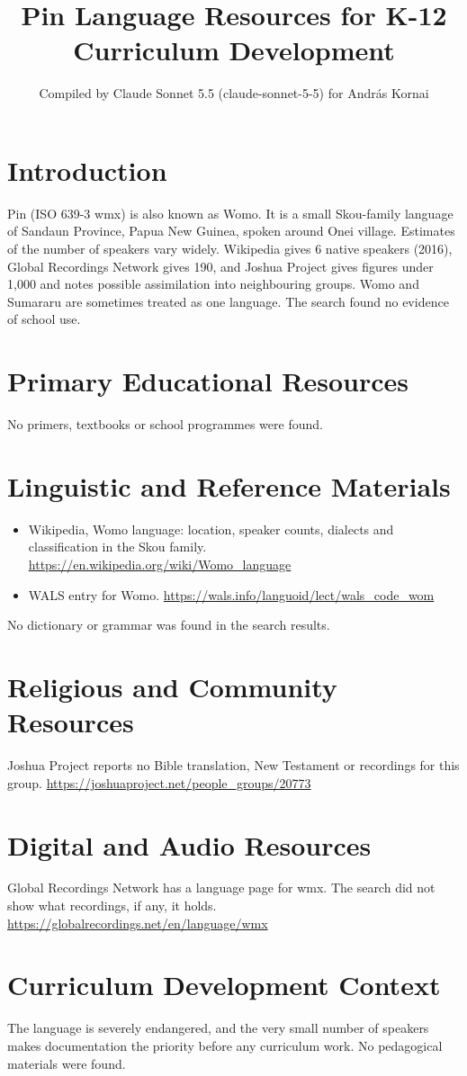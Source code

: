 \documentclass[12pt]{article}
\title{Pin Language Resources for K-12 Curriculum Development}
\author{Compiled by Claude Sonnet 5.5 (claude-sonnet-5-5) for Andr\'as Kornai}
\date{}
\begin{document}
\maketitle

\section{Introduction}
Pin (ISO 639-3 wmx) is also known as Womo. It is a small Skou-family language of Sandaun Province, Papua New Guinea, spoken around Onei village. Estimates of the number of speakers vary widely. Wikipedia gives 6 native speakers (2016), Global Recordings Network gives 190, and Joshua Project gives figures under 1,000 and notes possible assimilation into neighbouring groups. Womo and Sumararu are sometimes treated as one language. The search found no evidence of school use.

\section{Primary Educational Resources}
No primers, textbooks or school programmes were found.

\section{Linguistic and Reference Materials}
\begin{itemize}
\item Wikipedia, Womo language: location, speaker counts, dialects and classification in the Skou family. \url{https://en.wikipedia.org/wiki/Womo_language}
\item WALS entry for Womo. \url{https://wals.info/languoid/lect/wals_code_wom}
\end{itemize}
No dictionary or grammar was found in the search results.

\section{Religious and Community Resources}
Joshua Project reports no Bible translation, New Testament or recordings for this group. \url{https://joshuaproject.net/people_groups/20773}

\section{Digital and Audio Resources}
Global Recordings Network has a language page for wmx. The search did not show what recordings, if any, it holds. \url{https://globalrecordings.net/en/language/wmx}

\section{Curriculum Development Context}
The language is severely endangered, and the very small number of speakers makes documentation the priority before any curriculum work. No pedagogical materials were found.
\end{document}
